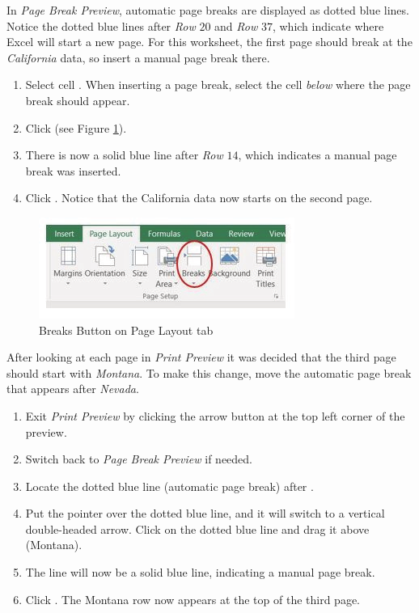 In \textit{Page Break Preview}, automatic page breaks are displayed as dotted blue lines. Notice the dotted blue lines after \textit{Row} $ 20 $ and \textit{Row} $ 37 $, which indicate where Excel will start a new page. For this worksheet, the first page should break at the \textit{California} data, so insert a manual page break there.

\begin{enumerate}
	\item Select cell . When inserting a page break, select the cell \textit{below} where the page break should appear.
	\item Click  (see Figure \ref{03:fig31}).
	\item There is now a solid blue line after \textit{Row} $ 14 $, which indicates a manual page break was inserted.
	\item Click . Notice that the California data now starts on the second page.
\end{enumerate}

\begin{figure}[H]
	\centering
	\includegraphics[width=\maxwidth{.95\linewidth}]{gfx/ch03_fig31}
	\caption{Breaks Button on Page Layout tab}
	\label{03:fig31}
\end{figure}

After looking at each page in \textit{Print Preview} it was decided that the third page should start with \textit{Montana}. To make this change, move the automatic page break that appears after \textit{Nevada}.

\begin{enumerate}
	\item Exit \textit{Print Preview} by clicking the arrow button at the top left corner of the preview.
	\item Switch back to \textit{Page Break Preview} if needed.
	\item Locate the dotted blue line (automatic page break) after .
	\item Put the pointer over the dotted blue line, and it will switch to a vertical double-headed arrow. Click on the dotted blue line and drag it above  (Montana).
	\item The line will now be a solid blue line, indicating a manual page break.
	\item Click . The Montana row now appears at the top of the third page.
\end{enumerate}

